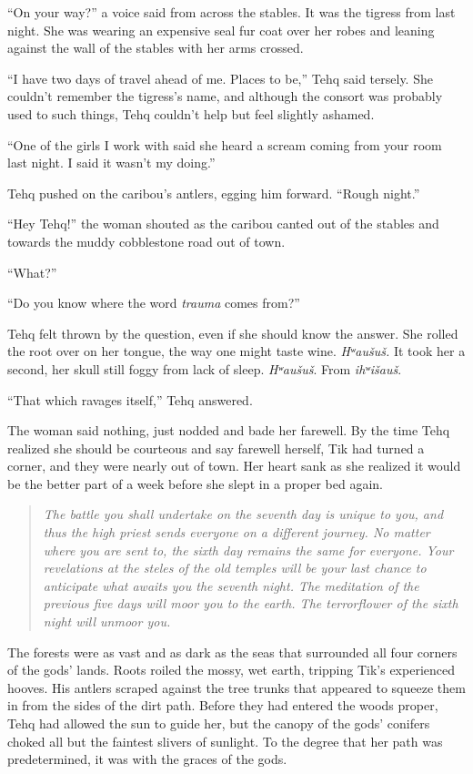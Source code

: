 ``On your way?'' a voice said from across the stables. It was the tigress from last night. She was wearing an expensive seal fur coat over her robes and leaning against the wall of the stables with her arms crossed.

``I have two days of travel ahead of me. Places to be,'' Tehq said tersely. She couldn't remember the tigress's name, and although the consort was probably used to such things, Tehq couldn't help but feel slightly ashamed.

``One of the girls I work with said she heard a scream coming from your room last night. I said it wasn't my doing.''

Tehq pushed on the caribou's antlers, egging him forward. ``Rough night.''

``Hey Tehq!'' the woman shouted as the caribou canted out of the stables and towards the muddy cobblestone road out of town.

``What?''

``Do you know where the word \emph{trauma} comes from?''

Tehq felt thrown by the question, even if she should know the answer. She rolled the root over on her tongue, the way one might taste wine. \emph{Hʷaušuš.} It took her a second, her skull still foggy from lack of sleep. \emph{Hʷaušuš}. From \emph{ihʷišauš}.

``That which ravages itself,'' Tehq answered.

The woman said nothing, just nodded and bade her farewell. By the time Tehq realized she should be courteous and say farewell herself, Tik had turned a corner, and they were nearly out of town. Her heart sank as she realized it would be the better part of a week before she slept in a proper bed again.

\vspace{-1ex}

\begin{quote}
\emph{The battle you shall undertake on the seventh day is unique to you, and thus the high priest sends everyone on a different journey. No matter where you are sent to, the sixth day remains the same for everyone. Your revelations at the steles of the old temples will be your last chance to anticipate what awaits you the seventh night. The meditation of the previous five days will moor you to the earth. The terrorflower of the sixth night will unmoor you.}
\end{quote}

\noindent The forests were as vast and as dark as the seas that surrounded all four corners of the gods' lands. Roots roiled the mossy, wet earth, tripping Tik's experienced hooves. His antlers scraped against the tree trunks that appeared to squeeze them in from the sides of the dirt path. Before they had entered the woods proper, Tehq had allowed the sun to guide her, but the canopy of the gods' conifers choked all but the faintest slivers of sunlight. To the degree that her path was predetermined, it was with the graces of the gods.

